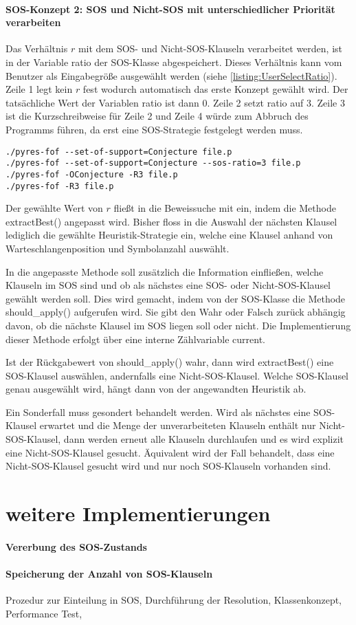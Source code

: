 \paragraph{SOS-Konzept 2: SOS und Nicht-SOS mit unterschiedlicher Priorität verarbeiten}

Das Verhältnis $r$ mit dem SOS- und Nicht-SOS-Klauseln verarbeitet werden, ist in der Variable ratio der SOS-Klasse abgespeichert. Dieses Verhältnis kann vom Benutzer als Eingabegröße ausgewählt werden (siehe \ref{listing:UserSelectRatio}). Zeile 1 legt kein $r$ fest wodurch automatisch das erste Konzept gewählt wird. Der tatsächliche Wert der Variablen ratio ist dann 0. Zeile 2 setzt ratio auf 3. Zeile 3 ist die Kurzschreibweise für Zeile 2 und Zeile 4 würde zum Abbruch des Programms führen, da erst eine SOS-Strategie festgelegt werden muss.

\begin{lstlisting}[label={listing:UserSelectRatio}]
./pyres-fof --set-of-support=Conjecture file.p
./pyres-fof --set-of-support=Conjecture --sos-ratio=3 file.p
./pyres-fof -OConjecture -R3 file.p
./pyres-fof -R3 file.p
\end{lstlisting}

Der gewählte Wert von $r$ fließt in die Beweissuche mit ein, indem die Methode extractBest() angepasst wird. Bisher floss in die Auswahl der nächsten Klausel lediglich die gewählte Heuristik-Strategie ein, welche eine Klausel anhand von Warteschlangenposition und Symbolanzahl auswählt. 

In die angepasste Methode soll zusätzlich die Information einfließen, welche Klauseln im SOS sind und ob als nächstes eine SOS- oder Nicht-SOS-Klausel gewählt werden soll. Dies wird gemacht, indem von der SOS-Klasse die Methode should\_apply() aufgerufen wird. Sie gibt den Wahr oder Falsch zurück abhängig davon, ob die nächste Klausel im SOS liegen soll oder nicht. Die Implementierung dieser Methode erfolgt über eine interne Zählvariable current.

Ist der Rückgabewert von should\_apply() wahr, dann wird extractBest() eine SOS-Klausel auswählen, andernfalls eine Nicht-SOS-Klausel. Welche SOS-Klausel genau ausgewählt wird, hängt dann von der angewandten Heuristik ab.

Ein Sonderfall muss gesondert behandelt werden. Wird als nächstes eine SOS-Klausel erwartet und die Menge der unverarbeiteten Klauseln enthält nur Nicht-SOS-Klausel, dann werden erneut alle Klauseln durchlaufen und es wird explizit eine Nicht-SOS-Klausel gesucht. Äquivalent wird der Fall behandelt, dass eine Nicht-SOS-Klausel gesucht wird und nur noch SOS-Klauseln vorhanden sind.

\section{weitere Implementierungen}
\paragraph{Vererbung des SOS-Zustands}
\paragraph{Speicherung der Anzahl von SOS-Klauseln}

Prozedur zur Einteilung in SOS,
Durchführung der Resolution,
Klassenkonzept,
Performance Test,